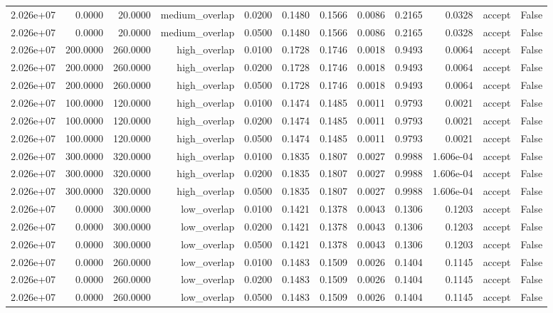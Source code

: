 \begin{table}[t]
\begin{tabular}{lrrrrrrrrrrr}
2.026e+07 & 0.0000 & 20.0000 & medium\_overlap & 0.0200 & 0.1480 & 0.1566 & 0.0086 & 0.2165 & 0.0328 & accept & False \\
2.026e+07 & 0.0000 & 20.0000 & medium\_overlap & 0.0500 & 0.1480 & 0.1566 & 0.0086 & 0.2165 & 0.0328 & accept & False \\
2.026e+07 & 200.0000 & 260.0000 & high\_overlap & 0.0100 & 0.1728 & 0.1746 & 0.0018 & 0.9493 & 0.0064 & accept & False \\
2.026e+07 & 200.0000 & 260.0000 & high\_overlap & 0.0200 & 0.1728 & 0.1746 & 0.0018 & 0.9493 & 0.0064 & accept & False \\
2.026e+07 & 200.0000 & 260.0000 & high\_overlap & 0.0500 & 0.1728 & 0.1746 & 0.0018 & 0.9493 & 0.0064 & accept & False \\
2.026e+07 & 100.0000 & 120.0000 & high\_overlap & 0.0100 & 0.1474 & 0.1485 & 0.0011 & 0.9793 & 0.0021 & accept & False \\
2.026e+07 & 100.0000 & 120.0000 & high\_overlap & 0.0200 & 0.1474 & 0.1485 & 0.0011 & 0.9793 & 0.0021 & accept & False \\
2.026e+07 & 100.0000 & 120.0000 & high\_overlap & 0.0500 & 0.1474 & 0.1485 & 0.0011 & 0.9793 & 0.0021 & accept & False \\
2.026e+07 & 300.0000 & 320.0000 & high\_overlap & 0.0100 & 0.1835 & 0.1807 & 0.0027 & 0.9988 & 1.606e-04 & accept & False \\
2.026e+07 & 300.0000 & 320.0000 & high\_overlap & 0.0200 & 0.1835 & 0.1807 & 0.0027 & 0.9988 & 1.606e-04 & accept & False \\
2.026e+07 & 300.0000 & 320.0000 & high\_overlap & 0.0500 & 0.1835 & 0.1807 & 0.0027 & 0.9988 & 1.606e-04 & accept & False \\
2.026e+07 & 0.0000 & 300.0000 & low\_overlap & 0.0100 & 0.1421 & 0.1378 & 0.0043 & 0.1306 & 0.1203 & accept & False \\
2.026e+07 & 0.0000 & 300.0000 & low\_overlap & 0.0200 & 0.1421 & 0.1378 & 0.0043 & 0.1306 & 0.1203 & accept & False \\
2.026e+07 & 0.0000 & 300.0000 & low\_overlap & 0.0500 & 0.1421 & 0.1378 & 0.0043 & 0.1306 & 0.1203 & accept & False \\
2.026e+07 & 0.0000 & 260.0000 & low\_overlap & 0.0100 & 0.1483 & 0.1509 & 0.0026 & 0.1404 & 0.1145 & accept & False \\
2.026e+07 & 0.0000 & 260.0000 & low\_overlap & 0.0200 & 0.1483 & 0.1509 & 0.0026 & 0.1404 & 0.1145 & accept & False \\
2.026e+07 & 0.0000 & 260.0000 & low\_overlap & 0.0500 & 0.1483 & 0.1509 & 0.0026 & 0.1404 & 0.1145 & accept & False \\

\end{tabular}
\end{table}
